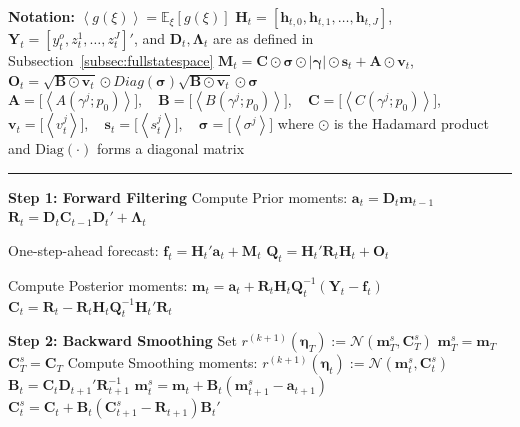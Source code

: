 \documentclass[APA,STIX1COL]{WileyNJD-v2}
\begin{document}
\begin{algorithm}
\caption{VB-Filtering and VB-Smoothing}
\label{alg:Alg4}
\begin{algorithmic}

\State \textbf{Notation:}
\State $\left\langle g(\xi) \right\rangle = \mathbb{E}_\xi\left[ g(\xi) \right]$
\State  $\mathbf{H}_t = [\mathbf{h}_{t,0}, \mathbf{h}_{t,1}, \ldots, \mathbf{h}_{t,J}]$, $\mathbf{Y}_t = [y_t^o, z_t^1, \ldots, z_t^J]'$, and $\mathbf{D}_t, \boldsymbol{\Lambda}_t$ are as defined in Subsection~\ref{subsec:fullstatespace}
\State $\mathbf{M}_t= \mathbf{C} \odot  \mathbf{\sigma} \odot | \mathbf{\gamma} | \odot \mathbf{s}_t + \mathbf{A} \odot \mathbf{v}_t$, \quad $\mathbf{O}_t= \sqrt{\mathbf{B} \odot \mathbf{v}_t} \odot Diag
(\mathbf{\sigma}) \sqrt{\mathbf{B} \odot \mathbf{v}_t} \odot \mathbf{\sigma}$
\State  \(
\mathbf{A} = \big[ \left\langle A(\gamma^j;p_0)  \right\rangle \big], \quad \mathbf{B} = \big[ \left\langle B(\gamma^j;p_0)  \right\rangle \big], \quad \mathbf{C} = \big[ \left\langle C(\gamma^j;p_0)  \right\rangle \big] \), 
\State \( \mathbf{v}_t = \big[ \left\langle v^j_t  \right\rangle \big], \quad  \mathbf{s}_t = \big[ \left\langle
s^j_t  \right\rangle \big] , \quad \mathbf{\sigma} = \big[ \left\langle \sigma^j  \right\rangle \big]
\)
\State where \(\odot\) is the Hadamard product and \(\mathrm{Diag}(\cdot)\) forms a diagonal matrix
\vspace{0.1cm}
\Statex \rule{\linewidth}{0.4pt}
\vspace{0.1cm}

\State \textbf{Step 1: Forward Filtering}
    \State Compute Prior moments:
    \State $\mathbf{a}_t = \mathbf{D}_t \mathbf{m}_{t-1}$
    \State $\mathbf{R}_t = \mathbf{D}_t \mathbf{C}_{t-1} \mathbf{D}_t' +  \boldsymbol{\Lambda}_t$

    \State One-step-ahead forecast:
    \State $\mathbf{f}_t = \mathbf{H}_t'\mathbf{a}_t + \mathbf{M}_t$
    \State $\mathbf{Q}_t = \mathbf{H}_t'\mathbf{R}_t\mathbf{H}_t + \mathbf{O}_t$
    
    \State Compute Posterior moments:
    \State $\mathbf{m}_t = \mathbf{a}_t + \mathbf{R}_t \mathbf{H}_t \mathbf{Q}_t^{-1}(\mathbf{Y}_t - \mathbf{f}_t)$
    \State $\mathbf{C}_t = \mathbf{R}_t - \mathbf{R}_t \mathbf{H}_t \mathbf{Q}_t^{-1} \mathbf{H}_t' \mathbf{R}_t$
\EndFor

\State \textbf{Step 2: Backward Smoothing}
        \State Set $r^{(k+1)}(\boldsymbol{\eta}_T) := \mathcal{N}(\mathbf{m}_T^s, \mathbf{C}_T^s)$
        \State $\mathbf{m}_T^s = \mathbf{m}_T$
        \State $\mathbf{C}_T^s = \mathbf{C}_T$
    \Else
        \State Compute Smoothing moments:
        \State $r^{(k+1)}(\boldsymbol{\eta}_t) := \mathcal{N}(\mathbf{m}_t^s, \mathbf{C}_t^s)$
        \State $\mathbf{B}_t = \mathbf{C}_t \mathbf{D}_{t+1}' \mathbf{R}_{t+1}^{-1}$
        \State $\mathbf{m}_t^s = \mathbf{m}_t + \mathbf{B}_t (\mathbf{m}_{t+1}^s - \mathbf{a}_{t+1})$
        \State $\mathbf{C}_t^s = \mathbf{C}_t + \mathbf{B}_t (\mathbf{C}_{t+1}^s - \mathbf{R}_{t+1}) \mathbf{B}_t'$
    \EndIf
\EndFor



\end{algorithmic}
\end{algorithm}
\end{document}
